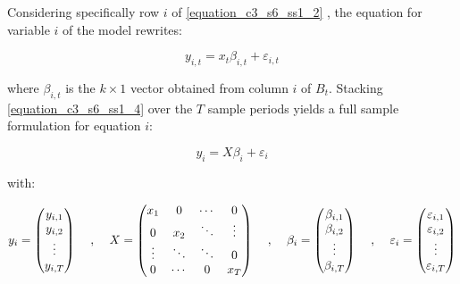 Considering specifically row $i$ of \ref{equation_c3_s6_ss1_2} , the equation for variable $i$ of the model rewrites:

\begin{equation}
y_{i,t}=x_t \beta_{i,t}+\varepsilon_{i,t}
\label{equation_c3_s6_ss1_4}
\end{equation}

where $\beta_{i,t}$ is the $k \times 1$ vector obtained from column $i$ of $B_t$. Stacking \ref{equation_c3_s6_ss1_4} over the $T$ sample periods yields a full sample formulation for equation $i$:

\begin{equation}
y_i= X \beta_i+\varepsilon_i
\label{equation_c3_s6_ss1_5} 
\end{equation}

with:

\begin{equation}
y_i=\left( \begin{matrix} y_{i,1} \\ y_{i,2} \\ \vdots \\ y_{i,T} \\ \end{matrix} \right)
\hspace{4mm} , \hspace{4mm}
X=\left( \begin{matrix} x_1 & 0 & \cdots & 0 \\ 0 & x_2 & \ddots & \vdots \\ \vdots & \ddots & \ddots & 0 \\ 0 & \cdots & 0 & x_T \\ \end{matrix} \right)
\hspace{4mm} , \hspace{4mm}
\beta_i=\left( \begin{matrix} \beta_{i,1} \\ \beta_{i,2} \\ \vdots \\ \beta_{i,T} \\ \end{matrix} \right)
\hspace{4mm} , \hspace{4mm}
\varepsilon_i=\left( \begin{matrix} \varepsilon_{i,1} \\ \varepsilon_{i,2} \\ \vdots \\ \varepsilon_{i,T} \\ \end{matrix} \right)
\label{equation_c3_s6_ss1_6} 
\end{equation}

